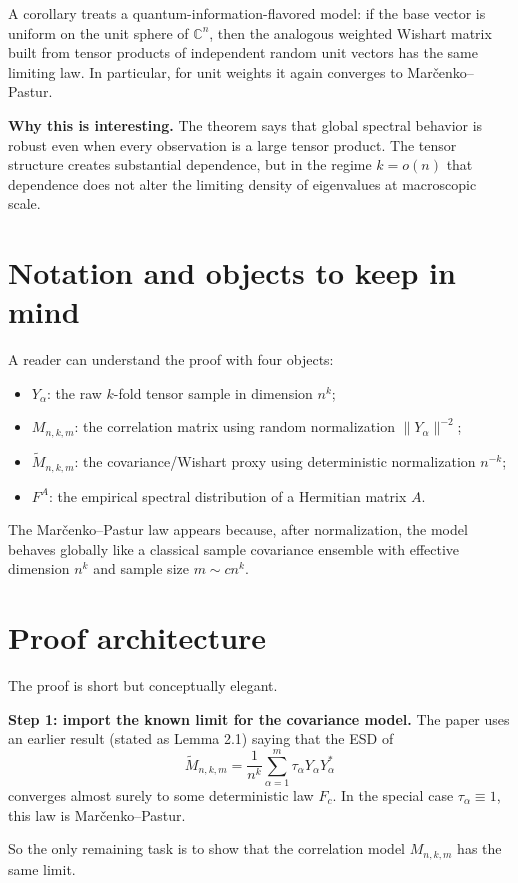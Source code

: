 \documentclass[11pt]{article}
\begin{document}
A corollary treats a quantum-information-flavored model: if the base vector is uniform on the unit sphere of $\mathbb C^n$, then the analogous weighted Wishart matrix built from tensor products of independent random unit vectors has the same limiting law. In particular, for unit weights it again converges to Mar\v cenko--Pastur.

\textbf{Why this is interesting.} The theorem says that global spectral behavior is robust even when every observation is a large tensor product. The tensor structure creates substantial dependence, but in the regime $k=o(n)$ that dependence does not alter the limiting density of eigenvalues at macroscopic scale.

\section*{Notation and objects to keep in mind}
A reader can understand the proof with four objects:
\begin{itemize}
    \item $Y_\alpha$: the raw $k$-fold tensor sample in dimension $n^k$;
    \item $M_{n,k,m}$: the correlation matrix using random normalization $\|Y_\alpha\|^{-2}$;
    \item $\widetilde M_{n,k,m}$: the covariance/Wishart proxy using deterministic normalization $n^{-k}$;
    \item $F^A$: the empirical spectral distribution of a Hermitian matrix $A$.
\end{itemize}
The Mar\v cenko--Pastur law appears because, after normalization, the model behaves globally like a classical sample covariance ensemble with effective dimension $n^k$ and sample size $m\sim c n^k$.

\section*{Proof architecture}
The proof is short but conceptually elegant.

\textbf{Step 1: import the known limit for the covariance model.}
The paper uses an earlier result (stated as Lemma 2.1) saying that the ESD of
\[
\widetilde M_{n,k,m}=\frac1{n^k}\sum_{\alpha=1}^m \tau_\alpha Y_\alpha Y_\alpha^*
\]
converges almost surely to some deterministic law $F_c$. In the special case $\tau_\alpha\equiv 1$, this law is Mar\v cenko--Pastur.

So the only remaining task is to show that the correlation model $M_{n,k,m}$ has the same limit.
\end{document}
